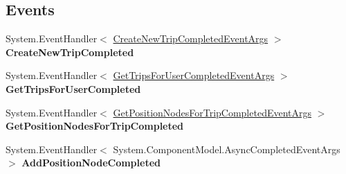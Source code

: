 \subsection*{Events}
\begin{DoxyCompactItemize}
\item 
\hypertarget{class_silverlight_showcase_1_1_tripi_silverlight_w_c_f_service_reference_1_1_tripi_silverlight_w_c_f_service_client_acb9b351a6b7ed2d162b2d7660690931c}{
System.EventHandler$<$ \hyperlink{class_silverlight_showcase_1_1_tripi_silverlight_w_c_f_service_reference_1_1_create_new_trip_completed_event_args}{CreateNewTripCompletedEventArgs} $>$ {\bfseries CreateNewTripCompleted}}
\label{class_silverlight_showcase_1_1_tripi_silverlight_w_c_f_service_reference_1_1_tripi_silverlight_w_c_f_service_client_acb9b351a6b7ed2d162b2d7660690931c}

\item 
\hypertarget{class_silverlight_showcase_1_1_tripi_silverlight_w_c_f_service_reference_1_1_tripi_silverlight_w_c_f_service_client_a8462b335855566047375e75591799202}{
System.EventHandler$<$ \hyperlink{class_silverlight_showcase_1_1_tripi_silverlight_w_c_f_service_reference_1_1_get_trips_for_user_completed_event_args}{GetTripsForUserCompletedEventArgs} $>$ {\bfseries GetTripsForUserCompleted}}
\label{class_silverlight_showcase_1_1_tripi_silverlight_w_c_f_service_reference_1_1_tripi_silverlight_w_c_f_service_client_a8462b335855566047375e75591799202}

\item 
\hypertarget{class_silverlight_showcase_1_1_tripi_silverlight_w_c_f_service_reference_1_1_tripi_silverlight_w_c_f_service_client_af11a43fa956d8bfb488d855e157965fb}{
System.EventHandler$<$ \hyperlink{class_silverlight_showcase_1_1_tripi_silverlight_w_c_f_service_reference_1_1_get_position_nodes_for_trip_completed_event_args}{GetPositionNodesForTripCompletedEventArgs} $>$ {\bfseries GetPositionNodesForTripCompleted}}
\label{class_silverlight_showcase_1_1_tripi_silverlight_w_c_f_service_reference_1_1_tripi_silverlight_w_c_f_service_client_af11a43fa956d8bfb488d855e157965fb}

\item 
\hypertarget{class_silverlight_showcase_1_1_tripi_silverlight_w_c_f_service_reference_1_1_tripi_silverlight_w_c_f_service_client_a217992eb30049997afe9937fc6e024ac}{
System.EventHandler$<$ System.ComponentModel.AsyncCompletedEventArgs $>$ {\bfseries AddPositionNodeCompleted}}
\label{class_silverlight_showcase_1_1_tripi_silverlight_w_c_f_service_reference_1_1_tripi_silverlight_w_c_f_service_client_a217992eb30049997afe9937fc6e024ac}


\end{DoxyCompactItemize}
